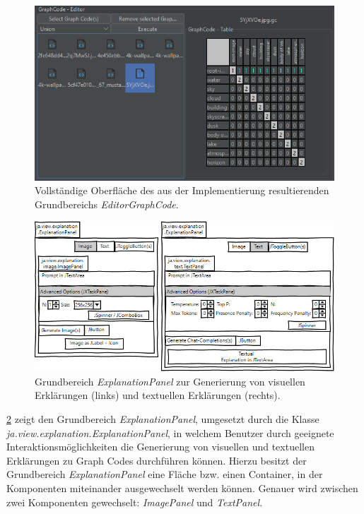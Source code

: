 \begin{figure}[!ht]
  \includegraphics[width=\textwidth]{chapter/chapter_4/wireframe-impl-ui-left-complete}
  \caption{Vollständige Oberfläche des aus der Implementierung resultierenden Grundbereichs \textit{EditorGraphCode}.}
  \label{sec4:impl:par:ui-elements:fig:wireframe-ui-left-complete}
\end{figure}


\begin{figure}[!ht]
  \includegraphics[width=\textwidth]{chapter/chapter_4/wireframe-impl-right}
  \caption{Grundbereich \textit{ExplanationPanel} zur Generierung von visuellen Erklärungen (links) und textuellen Erklärungen (rechts).}
  \label{sec4:impl:subsubsec:ui:fig:wireframe-explanation-panel}
\end{figure}

\cref{sec4:impl:subsubsec:ui:fig:wireframe-explanation-panel} zeigt den Grundbereich \textit{ExplanationPanel}, umgesetzt durch die Klasse \textit{ja.view.explanation.ExplanationPanel}, in welchem Benutzer durch geeignete Interaktionsmöglichkeiten die Generierung von visuellen und textuellen Erklärungen zu Graph Codes durchführen können.
Hierzu besitzt der Grundbereich \textit{ExplanationPanel} eine Fläche bzw. einen Container, in der Komponenten miteinander ausgewechselt werden können.
Genauer wird zwischen zwei Komponenten gewechselt: \textit{ImagePanel} und \textit{TextPanel}.

